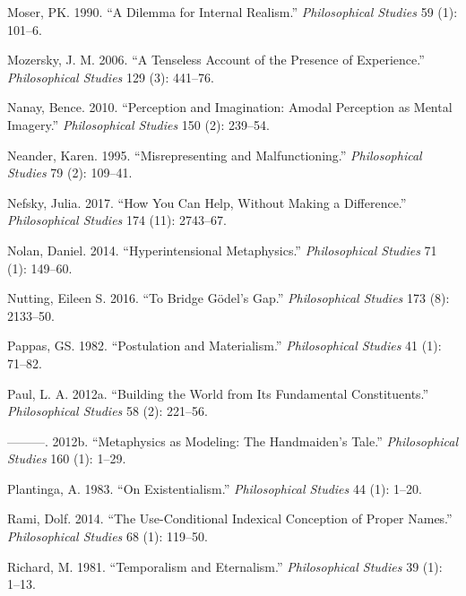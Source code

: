 \documentclass[
  10pt,
  letterpaper,
  DIV=11,
  numbers=noendperiod,
  twoside]{scrartcl}
\newlength{\cslhangindent}
\newenvironment{CSLReferences}[2] %
 {\begin{list}{}{%
  \setlength{\itemindent}{0pt}
  \setlength{\leftmargin}{0pt}
  \setlength{\parsep}{0pt}
  \ifodd #1
   \setlength{\leftmargin}{\cslhangindent}
   \setlength{\itemindent}{-1\cslhangindent}
  \fi
  \setlength{\itemsep}{#2\baselineskip}}}
 {\end{list}}
\begin{document}
\begin{CSLReferences}{1}{0}
Moser, PK. 1990. {``A Dilemma for Internal Realism.''}
\emph{Philosophical Studies} 59 (1): 101--6.

Mozersky, J. M. 2006. {``A Tenseless Account of the Presence of
Experience.''} \emph{Philosophical Studies} 129 (3): 441--76.

Nanay, Bence. 2010. {``Perception and Imagination: Amodal Perception as
Mental Imagery.''} \emph{Philosophical Studies} 150 (2): 239--54.

Neander, Karen. 1995. {``Misrepresenting and Malfunctioning.''}
\emph{Philosophical Studies} 79 (2): 109--41.

Nefsky, Julia. 2017. {``How You Can Help, Without Making a
Difference.''} \emph{Philosophical Studies} 174 (11): 2743--67.

Nolan, Daniel. 2014. {``Hyperintensional Metaphysics.''}
\emph{Philosophical Studies} 71 (1): 149--60.

Nutting, Eileen S. 2016. {``To Bridge Gödel's Gap.''}
\emph{Philosophical Studies} 173 (8): 2133--50.

Pappas, GS. 1982. {``Postulation and Materialism.''} \emph{Philosophical
Studies} 41 (1): 71--82.

Paul, L. A. 2012a. {``Building the World from Its Fundamental
Constituents.''} \emph{Philosophical Studies} 58 (2): 221--56.

---------. 2012b. {``Metaphysics as Modeling: The Handmaiden's Tale.''}
\emph{Philosophical Studies} 160 (1): 1--29.

Plantinga, A. 1983. {``On Existentialism.''} \emph{Philosophical
Studies} 44 (1): 1--20.

Rami, Dolf. 2014. {``The Use-Conditional Indexical Conception of Proper
Names.''} \emph{Philosophical Studies} 68 (1): 119--50.

Richard, M. 1981. {``Temporalism and Eternalism.''} \emph{Philosophical
Studies} 39 (1): 1--13.


\end{CSLReferences}
\end{document}

